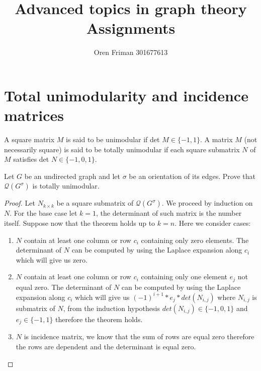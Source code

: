 \documentclass[a4paper, 11pt, oneside]{article}
\newenvironment{problem}[1]
  {\renewcommand\theinnercustomprob{#1}\innercustomprob}
  {\endinnercustomprob}
\begin{document}
\title{Advanced topics in graph theory Assignments}
\author{Oren Friman 301677613}
\maketitle

\section{Total unimodularity and incidence matrices}

A square matrix $M$ is said to be unimodular if det $M\in \{-1, 1\}$. A matrix $M$ (not necessarily
square) is said to be totally unimodular if each square submatrix $N$ of $M$ satisfies det $N \in \{-1, 0, 1\}$.

\begin{problem}{1.1}\label{problem1.1}
Let $G$ be an undirected graph and let $\sigma$ be an orientation of its edges. Prove that
$\mathcal{Q}(G^\sigma)$ is totally unimodular.
\end{problem}

\begin{proof}
Let $N_{k\times k}$ be a square submatrix of $\mathcal{Q}(G^\sigma)$. We proceed by induction on $N$. For the base case let $k = 1$, the determinant of such matrix is the number itself. Suppose now that the theorem holds up to $k=n$. Here we consider cases:
\begin{enumerate}[label=(\alph*)]
\item $N$ contain at least one column or row $c_i$ containing only zero elements. The determinant of $N$ can be computed by using the Laplace expansion along $c_i$ which will give us zero.
\item $N$ contain at least one column or row $c_i$ containing only one element $e_j$ not equal zero. The determinant of $N$ can be computed by using the Laplace expansion along $c_i$ which will give us $(-1)^{i+ 1} * e_j * det(N_{i,j})$ where $N_{i,j}$ is submatrix of $N$, from the induction hypothesis $det(N_{i,j}) \in\{-1, 0, 1\}$ and $e_j \in\{-1, 1\}$ therefore the theorem holds.
\item $N$ is incidence matrix, we know that the sum of rows are equal zero therefore the rows are dependent and the determinant is equal zero.
\end{enumerate}
\end{proof}
\end{document}
